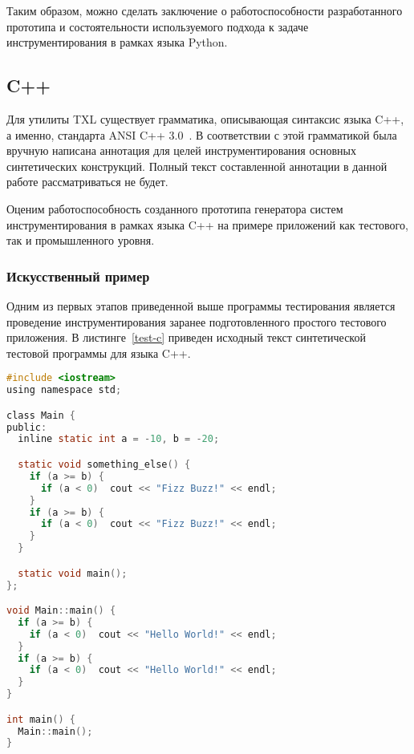 Таким образом, можно сделать заключение о работоспособности разработанного прототипа и состоятельности используемого подхода к задаче инструментирования в рамках языка Python.

\subsection{C++}

Для утилиты TXL существует грамматика, описывающая синтаксис языка C++, а именно, стандарта ANSI C++ 3.0~\cite{txl-resources}.
В соответствии с этой грамматикой была вручную написана аннотация для целей инструментирования основных синтетических конструкций.
Полный текст составленной аннотации в данной работе рассматриваться не будет.

Оценим работоспособность созданного прототипа генератора систем инструментирования в рамках языка C++ на примере приложений как тестового, так и промышленного уровня.

\subsubsection{Искусственный пример}

Одним из первых этапов приведенной выше программы тестирования является проведение инструментирования заранее подготовленного простого тестового приложения.
В листинге~\ref{test-c} приведен исходный текст синтетической тестовой программы для языка C++.

\begin{lstlisting}[frame=single, language=C, label={test-c}, caption={Исходный текст тестового приложения.}]
#include <iostream>
using namespace std;

class Main {
public:
  inline static int a = -10, b = -20;

  static void something_else() {
    if (a >= b) {
      if (a < 0)  cout << "Fizz Buzz!" << endl;
    }
    if (a >= b) {
      if (a < 0)  cout << "Fizz Buzz!" << endl;
    }
  }

  static void main();
};

void Main::main() {
  if (a >= b) {
    if (a < 0)  cout << "Hello World!" << endl;
  }
  if (a >= b) {
    if (a < 0)  cout << "Hello World!" << endl;
  }
}

int main() {
  Main::main();
}
\end{lstlisting}

